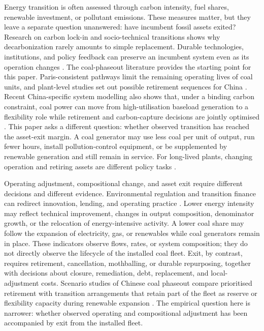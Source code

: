 \documentclass[11pt]{article}
\begin{document}
Energy transition is often assessed through carbon intensity, fuel shares, renewable investment, or pollutant emissions. These measures matter, but they leave a separate question unanswered: have incumbent fossil assets exited? Research on carbon lock-in and socio-technical transitions shows why decarbonization rarely amounts to simple replacement. Durable technologies, institutions, and policy feedback can preserve an incumbent system even as its operation changes \parencite{unruh2000,geelsschot2007,markardetal2012}. The coal-phaseout literature provides the starting point for this paper. Paris-consistent pathways limit the remaining operating lives of coal units, and plant-level studies set out possible retirement sequences for China \parencite{cui2019,cui2021}. Recent China-specific system modelling also shows that, under a binding carbon constraint, coal power can move from high-utilisation baseload generation to a flexibility role while retirement and carbon-capture decisions are jointly optimised \parencite{an2025}. This paper asks a different question: whether observed transition has reached the asset-exit margin. A coal generator may use less coal per unit of output, run fewer hours, install pollution-control equipment, or be supplemented by renewable generation and still remain in service. For long-lived plants, changing operation and retiring assets are different policy tasks \parencite{kefford2018}.

Operating adjustment, compositional change, and asset exit require different decisions and different evidence. Environmental regulation and transition finance can redirect innovation, lending, and operating practice \parencite{acemogluetal2012,campiglio2016}. Lower energy intensity may reflect technical improvement, changes in output composition, denominator growth, or the relocation of energy-intensive activity. A lower coal share may follow the expansion of electricity, gas, or renewables while coal generators remain in place. These indicators observe flows, rates, or system composition; they do not directly observe the lifecycle of the installed coal fleet. Exit, by contrast, requires retirement, cancellation, mothballing, or durable repurposing, together with decisions about closure, remediation, debt, replacement, and local-adjustment costs. Scenario studies of Chinese coal phaseout compare prioritised retirement with transition arrangements that retain part of the fleet as reserve or flexibility capacity during renewable expansion \parencite{cui2021,zhang2022phaseout,yin2021,an2025}. The empirical question here is narrower: whether observed operating and compositional adjustment has been accompanied by exit from the installed fleet.
\end{document}
